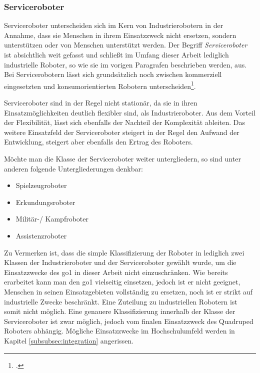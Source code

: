 \subsubsection{Serviceroboter}

Serviceroboter unterscheiden sich im Kern von Industrierobotern in der Annahme, dass sie Menschen in ihrem Einsatzzweck nicht ersetzen,
sondern unterstützen oder von Menschen unterstützt werden.
Der Begriff \emph{Serviceroboter} ist absichtlich weit gefasst und schließt im Umfang dieser Arbeit lediglich industrielle
Roboter, so wie sie im vorigen Paragrafen beschrieben werden, aus.
Bei Servicerobotern lässt sich grundsätzlich noch zwischen kommerziell eingesetzten und konsumorientierten Robotern unterscheiden\footcite{statista_robotics_market}.

Serviceroboter sind in der Regel nicht stationär, da sie in ihren Einsatzmöglichkeiten deutlich flexibler sind, als Industrieroboter.
Aus dem Vorteil der Flexibilität, lässt sich ebenfalls der Nachteil der Komplexität ableiten.
Das weitere Einsatzfeld der Serviceroboter steigert in der Regel den Aufwand der Entwicklung, steigert aber ebenfalls
den Ertrag des Roboters.

Möchte man die Klasse der Serviceroboter weiter untergliedern, so sind unter anderen folgende Untergliederungen denkbar:

\begin{itemize}
    \item Spielzeugroboter
    \item Erkundungsroboter
    \item Militär-/ Kampfroboter
    \item Assistenzroboter
\end{itemize}

Zu Vermerken ist, dass die simple Klassifizierung der Roboter in lediglich zwei Klassen der Industrieroboter und der Serviceroboter
gewählt wurde, um die Einsatzzwecke des \gls{go1} in dieser Arbeit nicht einzuschränken.
Wie bereits erarbeitet kann man den \gls{go1} vielseitig einsetzen, jedoch ist er nicht geeignet, Menschen in seinen Einsatzgebieten
vollständig zu ersetzen, noch ist er strikt auf industrielle Zwecke beschränkt.
Eine Zuteilung zu industriellen Robotern ist somit nicht möglich.
Eine genauere Klassifizierung innerhalb der Klasse der Serviceroboter ist zwar möglich, jedoch vom finalen Einsatzzweck des
Quadruped Roboters abhängig.
Mögliche Einsatzzwecke im Hochschulumfeld werden in Kapitel \ref{subsubsec:integration} angerissen.

